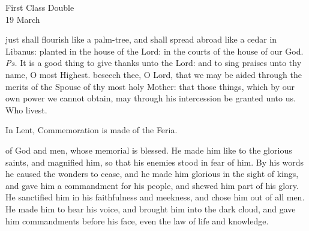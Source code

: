 \clearpage
{}
\begin{inhead}
    {First Class Double\\
19 March}
\end{inhead}
\par\noindent
{}


\vspace{-1ex}
\introit
{} just shall flourish like a palm-tree, and shall spread abroad like a cedar in Libanus: planted in the house of the Lord: in the courts of the house of our God. \textit{Ps.} It is a good thing to give thanks unto the Lord: and to sing praises unto thy name, O most Highest.
\collect
{} beseech thee, O Lord, that we may be aided through the merits of the Spouse of thy most holy Mother: that those things, which by our own power we cannot obtain, may through his intercession be granted unto us. Who livest.
\begin{rubric}
    In Lent, Commemoration is made of the Feria.
\end{rubric}
 of God and men, whose memorial is blessed. He made him like to the glorious saints, and magnified him, so that his enemies stood in fear of him. By his words he caused the wonders to cease, and he made him glorious in the sight of kings, and gave him a commandment for his people, and shewed him part of his glory. He sanctified him in his faithfulness and meekness, and chose him out of all men. He made him to hear his voice, and brought him into the dark cloud, and gave him commandments before his face, even the law of life and knowledge.
